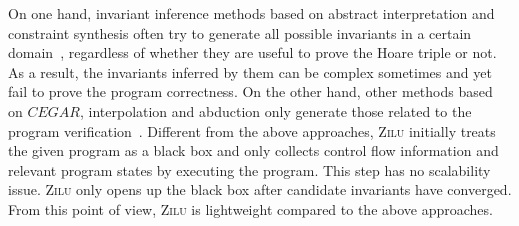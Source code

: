 On one hand, invariant inference methods based on abstract interpretation and constraint synthesis
often try to generate all possible invariants in a certain domain~\cite{mine2006octagon,vincent2009subpolyhedra,ashutosh2009invgen},
regardless of whether they are useful to prove the Hoare triple or not.
As a result, the invariants inferred by them can be complex sometimes and yet fail to prove the program correctness.
On the other hand, other methods based on $\mathit{CEGAR}$, interpolation and abduction only generate those related to the program verification~\cite{isil2013inductive}.
Different from the above approaches, \textsc{Zilu} initially treats the given program as a black box and only collects control flow information and relevant program states by executing the program.
This step has no scalability issue.
\textsc{Zilu} only opens up the black box after candidate invariants have converged.
From this point of view, \textsc{Zilu} is lightweight compared to the above approaches.

